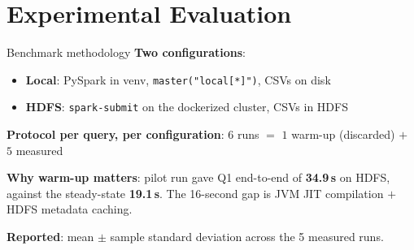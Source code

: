 \documentclass[aspectratio=169]{beamer}
\begin{document}
\section{Experimental Evaluation}
\begin{frame}{Benchmark methodology}
\textbf{Two configurations}:
\begin{itemize}
    \item \textbf{Local}: PySpark in venv, \texttt{master("local[*]")}, CSVs on disk
    \item \textbf{HDFS}: \texttt{spark-submit} on the dockerized cluster, CSVs in HDFS
\end{itemize}

\vspace{0.5em}
\textbf{Protocol per query, per configuration}: $6$ runs $=$ $1$ warm-up (discarded) $+$ $5$ measured

\vspace{0.5em}
\textbf{Why warm-up matters}: pilot run gave Q1 end-to-end of
\textbf{34.9\,s} on HDFS, against the steady-state \textbf{19.1\,s}.
The 16-second gap is JVM JIT compilation $+$ HDFS metadata caching.

\vspace{0.5em}
\textbf{Reported}: mean $\pm$ sample standard deviation across the 5
measured runs.

\end{frame}
\end{document}
